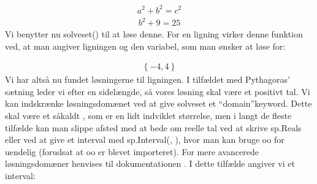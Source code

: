\documentclass[letterpaper,10pt,english]{jupyterBook}
\begin{document}
\begin{sphinxVerbatim}[commandchars=\\\{\}]
  \PYG{p}{[}   \PYG{p}{]}
\end{sphinxVerbatim}
\begin{equation*}
\begin{split}\displaystyle a^{2} + b^{2} = c^{2}\end{split}
\end{equation*}\begin{equation*}
\begin{split}\displaystyle b^{2} + 9 = 25\end{split}
\end{equation*}
Vi benytter nu solveset() til at løse denne. For en ligning virker denne funktion ved, at man angiver ligningen og den variabel, som man ønsker at løse for:

\begin{sphinxVerbatim}[commandchars=\\\{\}]
   
\end{sphinxVerbatim}
\begin{equation*}
\begin{split}\displaystyle \left\{-4, 4\right\}\end{split}
\end{equation*}
Vi har altså nu fundet løsningerne til ligningen. I tilfældet med Pythagoras’ sætning leder vi efter en sidelængde, så vores løsning skal være et positivt tal. Vi kan indskrænke løsningsdomænet ved at give solveset et “domain”\sphinxhyphen{}keyword. Dette skal være et såkaldt , som er en lidt indviklet størrelse, men i langt de fleste tilfælde kan man slippe afsted med at bede om reelle tal ved at skrive sp.Reals eller ved at give et interval med sp.Interval(, ), hvor man kan bruge oo for uendelig (forudsat at oo er blevet importeret). For mere avancerede løsningsdomæner henvises til dokumentationen . I dette tilfælde angiver vi et interval:
\end{document}
